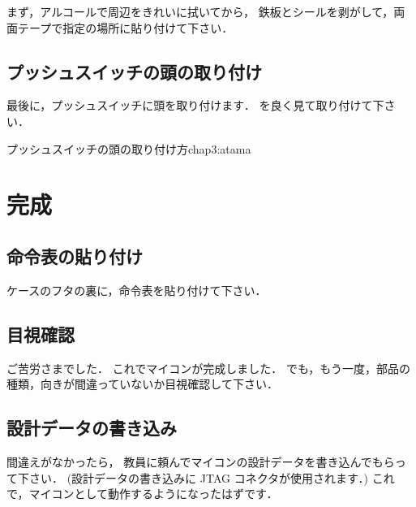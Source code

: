 まず，アルコールで周辺をきれいに拭いてから，
鉄板とシールを剥がして，両面テープで指定の場所に貼り付けて下さい．


\subsection{プッシュスイッチの頭の取り付け}
最後に，プッシュスイッチに頭を取り付けます．
を良く見て取り付けて下さい．

{プッシュスイッチの頭の取り付け方}{chap3:atama}

\section{完成}

\subsection{命令表の貼り付け}
ケースのフタの裏に，命令表を貼り付けて下さい．

\subsection{目視確認}
ご苦労さまでした．
これでマイコンが完成しました．
でも，もう一度，部品の種類，向きが間違っていないか目視確認して下さい．


\subsection{設計データの書き込み}
間違えがなかったら，
教員に頼んでマイコンの設計データを書き込んでもらって下さい．
(設計データの書き込みに JTAG コネクタが使用されます．)
これで，マイコンとして動作するようになったはずです．

